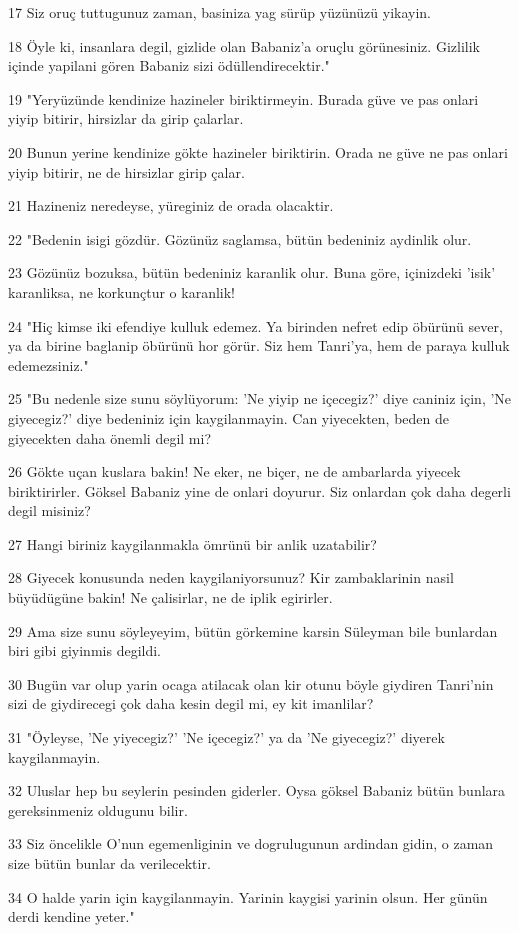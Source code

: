 \par 17 Siz oruç tuttugunuz zaman, basiniza yag sürüp yüzünüzü yikayin.
\par 18 Öyle ki, insanlara degil, gizlide olan Babaniz'a oruçlu görünesiniz. Gizlilik içinde yapilani gören Babaniz sizi ödüllendirecektir."
\par 19 "Yeryüzünde kendinize hazineler biriktirmeyin. Burada güve ve pas onlari yiyip bitirir, hirsizlar da girip çalarlar.
\par 20 Bunun yerine kendinize gökte hazineler biriktirin. Orada ne güve ne pas onlari yiyip bitirir, ne de hirsizlar girip çalar.
\par 21 Hazineniz neredeyse, yüreginiz de orada olacaktir.
\par 22 "Bedenin isigi gözdür. Gözünüz saglamsa, bütün bedeniniz aydinlik olur.
\par 23 Gözünüz bozuksa, bütün bedeniniz karanlik olur. Buna göre, içinizdeki 'isik' karanliksa, ne korkunçtur o karanlik!
\par 24 "Hiç kimse iki efendiye kulluk edemez. Ya birinden nefret edip öbürünü sever, ya da birine baglanip öbürünü hor görür. Siz hem Tanri'ya, hem de paraya kulluk edemezsiniz."
\par 25 "Bu nedenle size sunu söylüyorum: 'Ne yiyip ne içecegiz?' diye caniniz için, 'Ne giyecegiz?' diye bedeniniz için kaygilanmayin. Can yiyecekten, beden de giyecekten daha önemli degil mi?
\par 26 Gökte uçan kuslara bakin! Ne eker, ne biçer, ne de ambarlarda yiyecek biriktirirler. Göksel Babaniz yine de onlari doyurur. Siz onlardan çok daha degerli degil misiniz?
\par 27 Hangi biriniz kaygilanmakla ömrünü bir anlik uzatabilir?
\par 28 Giyecek konusunda neden kaygilaniyorsunuz? Kir zambaklarinin nasil büyüdügüne bakin! Ne çalisirlar, ne de iplik egirirler.
\par 29 Ama size sunu söyleyeyim, bütün görkemine karsin Süleyman bile bunlardan biri gibi giyinmis degildi.
\par 30 Bugün var olup yarin ocaga atilacak olan kir otunu böyle giydiren Tanri'nin sizi de giydirecegi çok daha kesin degil mi, ey kit imanlilar?
\par 31 "Öyleyse, 'Ne yiyecegiz?' 'Ne içecegiz?' ya da 'Ne giyecegiz?' diyerek kaygilanmayin.
\par 32 Uluslar hep bu seylerin pesinden giderler. Oysa göksel Babaniz bütün bunlara gereksinmeniz oldugunu bilir.
\par 33 Siz öncelikle O'nun egemenliginin ve dogrulugunun ardindan gidin, o zaman size bütün bunlar da verilecektir.
\par 34 O halde yarin için kaygilanmayin. Yarinin kaygisi yarinin olsun. Her günün derdi kendine yeter."

